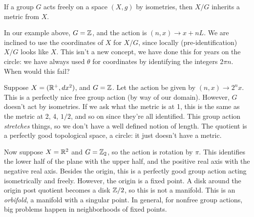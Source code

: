\begin{prop}
    If a group $G$ acts freely on a space $(X,g)$ by isometries, then $X /G$ inherits a metric from $X$. 
\end{prop}
In our example above, $G=\mathbb{Z}$, and the action is $(n,x) \to x+nL$. We are inclined to use the coordinates of $X$ for $X /G$, since locally (pre-identification) $X /G$ looks like $X$. This isn't a new concept, we have done this for years on the circle: we have always used $\theta$ for coordinates by identifying the integers $2\pi n$. When would this fail?
\begin{example}
    Suppose $X=(\mathbb{R}^+,dx^2)$, and $G=\mathbb{Z}$. Let the action be given by $(n,x)\to 2^n  x$. This is a perfectly nice free group action (by way of our domain). However, $G$ doesn't act by isometries. If we ask what the metric is at 1, this is the same as the metric at 2, 4, $1 /2$, and so on since they're all identified. This group action \emph{stretches} things, so we don't have a well defined notion of length. The quotient is a perfectly good topological space, a circle: it just doesn't have a metric.

    Now suppose $X=\mathbb{R}^2$ and $G=\mathbb{Z}_2$, so the action is rotation by $\pi$. This identifies the lower half of the plane with the upper half, and the positive real axis with the negative real axis. Besides the origin, this is a perfectly good group action acting isometrically and freely. However, the origin is a fixed point. A disk around the origin post quotient becomes a disk $\mathbb{Z} /2$, so this is not a manifold. This is an \emph{orbifold}, a manifold with a singular point. In general, for nonfree group actions, big problems happen in neighborhoods of fixed points.
\end{example}
